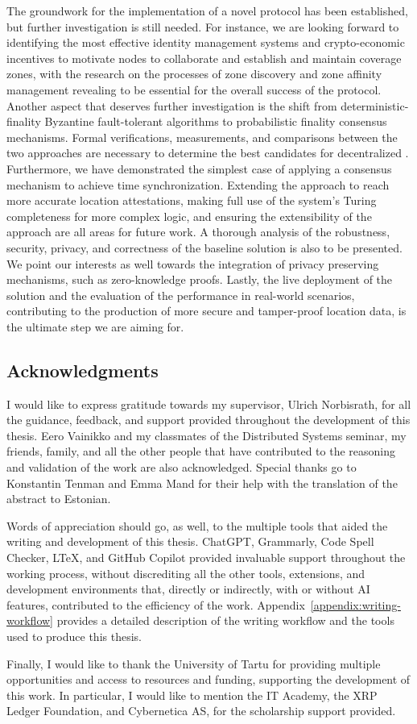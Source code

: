 The groundwork for the implementation of a novel \pol{} protocol has been established, but further investigation is still needed. For instance, we are looking forward to identifying the most effective identity management systems and crypto-economic incentives to motivate nodes to collaborate and establish and maintain coverage zones, with the research on the processes of zone discovery and zone affinity management revealing to be essential for the overall success of the protocol. Another aspect that deserves further investigation is the shift from deterministic-finality Byzantine fault-tolerant algorithms to probabilistic finality consensus mechanisms. Formal verifications, measurements, and comparisons between the two approaches are necessary to determine the best candidates for decentralized \pol{}. Furthermore, we have demonstrated the simplest case of applying a consensus mechanism to achieve time synchronization. Extending the approach to reach more accurate location attestations, making full use of the system's Turing completeness for more complex logic, and ensuring the extensibility of the approach are all areas for future work. A thorough analysis of the robustness, security, privacy, and correctness of the baseline solution is also to be presented. We point our interests as well towards the integration of privacy preserving mechanisms, such as zero-knowledge proofs. Lastly, the live deployment of the solution and the evaluation of the performance in real-world scenarios, contributing to the production of more secure and tamper-proof location data, is the ultimate step we are aiming for.

\subsection*{Acknowledgments}

I would like to express gratitude towards my supervisor, Ulrich Norbisrath, for all the guidance, feedback, and support provided throughout the development of this thesis. Eero Vainikko and my classmates of the Distributed Systems seminar, my friends, family, and all the other people that have contributed to the reasoning and validation of the work are also acknowledged. Special thanks go to Konstantin Tenman and Emma Mand for their help with the translation of the abstract to Estonian.

Words of appreciation should go, as well, to the multiple tools that aided the writing and development of this thesis. ChatGPT, Grammarly, Code Spell Checker, LTeX, and GitHub Copilot provided invaluable support throughout the working process, without discrediting all the other tools, extensions, and development environments that, directly or indirectly, with or without AI features, contributed to the efficiency of the work. Appendix~\ref{appendix:writing-workflow} provides a detailed description of the writing workflow and the tools used to produce this thesis.

Finally, I would like to thank the University of Tartu for providing multiple opportunities and access to resources and funding, supporting the development of this work. In particular, I would like to mention the IT Academy, the XRP Ledger Foundation, and Cybernetica AS, for the scholarship support provided.